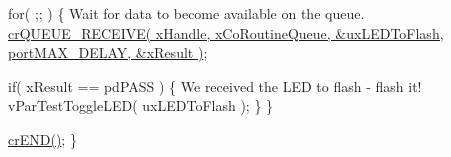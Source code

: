 \begin{DoxyPre}    for( ;; )
    \{
Wait for data to become available on the queue.
        \hyperlink{croutine_8h_a586d57fd9a3e2aa5ae66484ed3be36c9}{crQUEUE\_RECEIVE( xHandle, xCoRoutineQueue, &uxLEDToFlash, portMAX\_DELAY, &xResult )};\end{DoxyPre}



\begin{DoxyPre}        if( xResult == pdPASS )
        \{
We received the LED to flash - flash it!
            vParTestToggleLED( uxLEDToFlash );
        \}
    \}\end{DoxyPre}



\begin{DoxyPre}    \hyperlink{croutine_8h_ae6038cc976689b50000475ebfc4e2f23}{crEND()};
 \}\end{DoxyPre}
 